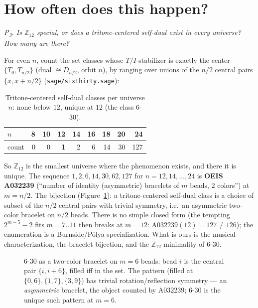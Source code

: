 \documentclass[11pt]{article}
\newcommand{\lean}[1]{\texttt{#1}}
\newcommand{\Ztwelve}{\mathbb{Z}_{12}}
\newcommand{\Dgrp}[1]{D_{#1}}
\newcommand{\question}[1]{\smallskip\noindent\textit{#1}\smallskip}
\begin{document}
\section{How often does this happen?}\label{sec:enum}

\question{P\textsubscript{3}. Is $\Ztwelve$ special, or does a tritone-centered self-dual exist in every
universe? How many are there?}

For even $n$, count the set classes whose $T/I$-stabilizer is exactly the center $\{T_0,T_{n/2}\}$ (dual
$\cong\Dgrp{n/2}$, orbit $n$), by ranging over unions of the $n/2$ central pairs $\{x,x+n/2\}$
(\lean{sage/sixthirty.sage}):

\begin{table}[h]
\centering
{}
\begin{tabular}{lrrrrrrrr}
\toprule
\rowcolor{ctA!22}
$n$    & 8 & 10 & \textbf{12} & 14 & 16 & 18 & 20 & 24\\
\midrule
count  & 0 & 0  & \textbf{1}  & 2  & 6  & 14 & 30 & 127\\
\bottomrule
\end{tabular}
\caption{Tritone-centered self-dual classes per universe $n$: none below $12$, unique at $12$ (the class
6-30).}
\label{tab:counts}
\end{table}

So $\Ztwelve$ is the smallest universe where the phenomenon exists, and there it is unique. The sequence
$1,2,6,14,30,62,127$ for $n=12,14,\dots,24$ is \textbf{OEIS A032239} (``number of identity (asymmetric)
bracelets of $m$ beads, $2$ colors'') at $m=n/2$. The bijection (Figure~\ref{fig:bracelet}): a
tritone-centered self-dual class is a choice of subset of the $n/2$ central pairs with trivial symmetry,
i.e.\ an asymmetric two-color bracelet on $n/2$ beads. There is no simple closed form (the tempting
$2^{m-5}-2$ fits $m=7..11$ then breaks at $m=12$: $\mathrm{A}032239(12)=127\ne126$); the enumeration is a
Burnside/P\'olya specialization. What is ours is the musical characterization, the bracelet bijection, and
the $\Ztwelve$-minimality of 6-30.

\begin{figure}[h]
\centering
{}
\caption{6-30 as a two-color bracelet on $m=6$ beads: bead $i$ is the central pair $\{i,i+6\}$, filled iff
in the set. The pattern (filled at $\{0,6\},\{1,7\},\{3,9\}$) has trivial rotation/reflection symmetry
--- an \emph{asymmetric} bracelet, the object counted by A032239; 6-30 is the unique such pattern at
$m=6$.}
\label{fig:bracelet}
\end{figure}
\end{document}
